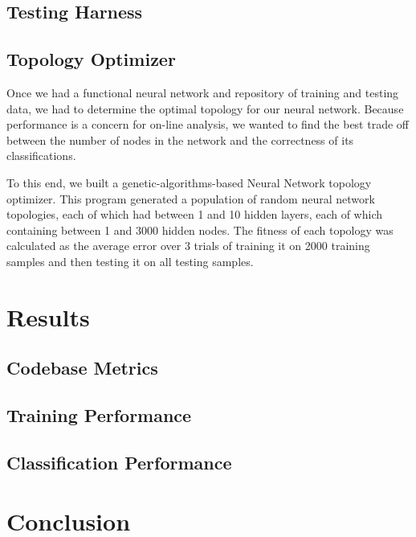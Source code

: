 \documentclass{report}
\begin{document}
\section{Testing Harness}

\section{Topology Optimizer}


Once we had a functional neural network and repository of training and testing data, we had to determine the optimal topology for our neural network. Because performance is a concern for on-line analysis, we wanted to find the best trade off between the number of nodes in the network and the correctness of its classifications.

To this end, we built a genetic-algorithms-based Neural Network topology optimizer. This program generated a population of random neural network topologies, each of which had between 1 and 10 hidden layers, each of which containing between 1 and 3000 hidden nodes. The fitness of each topology was calculated as the average error over 3 trials of training it on 2000 training samples and then testing it on all testing samples.

\chapter{Results}

\section{Codebase Metrics}


\section{Training Performance}


\section{Classification Performance}


\chapter{Conclusion}


\printbibliography
\end{document}
